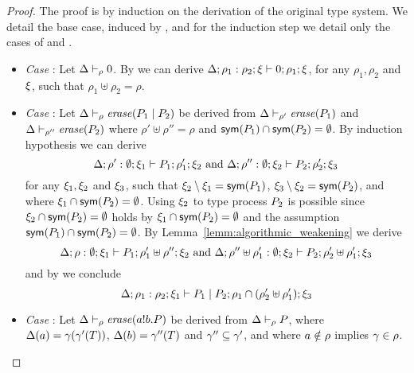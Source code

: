 \begin{proof}
The proof is by induction on the derivation of the original type system. We detail the base case, induced by , and for the induction step  we detail only the cases of  and .
\begin{itemize}
\item
\emph{Case} :
Let $\Delta \vdash_\rho 0$. 
By  we can derive $\Delta; \rho_1: \rho_2; \xi \vdash 0 ; \rho_1; \xi$, for any $\rho_1,  \rho_2$ and $\xi$, such that $\rho_1\uplus\rho_2=\rho$.
%
%
\item
\emph{Case} : Let $\Delta \vdash_{\rho} \mathit{erase} (P_1 \;|\; P_2)$ be derived from $\Delta \vdash_{\rho'} \mathit{erase}(P_1)$ and $\Delta \vdash_{\rho''} \mathit{erase}(P_2)$ where $\rho'\uplus\rho''=\rho$ and $\mathsf{sym}(P_1)\cap\mathsf{sym}(P_2)=\emptyset$.
By induction hypothesis we can derive
\[
\Delta; \rho': \emptyset; \xi_1 \vdash P_1; \rho_1'; \xi_2  \text{ and }  \Delta; \rho'': \emptyset; \xi_2 \vdash P_2; \rho_2'; \xi_3
\]
for any $\xi_1, \xi_2$ and $\xi_3$, such that $\xi_2\setminus\xi_1=\mathsf{sym}(P_1)$, $\xi_3\setminus\xi_2=\mathsf{sym}(P_2)$, and where $\xi_1 \cap \mathsf{sym}( P_2)=\emptyset$. Using $\xi_2$ to type process $P_2$  is possible since  $\xi_2\cap\mathsf{sym}(P_2)=\emptyset$ holds by $\xi_1 \cap \mathsf{sym}( P_2)=\emptyset$ and the assumption $\mathsf{sym}(P_1)\cap\mathsf{sym}(P_2)=\emptyset$.
By Lemma~\ref{lemm:algorithmic_weakening} we derive 
\[
\Delta; \rho: \emptyset; \xi_1 \vdash P_1; \rho_1'\uplus \rho''; \xi_2 \text{ and } \Delta; \rho''\uplus \rho_1': \emptyset; \xi_2 \vdash P_2; \rho_2'\uplus \rho_1'; \xi_3
\]
and by  we conclude
\[
\Delta; \rho_1: \rho_2; \xi_1 \vdash P_1 \;|\; P_2; \rho_1 \cap (\rho_2'\uplus \rho_1'); \xi_3
\]
%
%
\item
\emph{Case} : Let $\Delta \vdash_\rho \mathit{erase}(a!b.P)$ be derived from $\Delta \vdash_\rho P$, where $\Delta(a)=\gamma(\gamma'(T))$, $\Delta(b)=\gamma''(T)$ and $\gamma''\subseteq\gamma'$, and where $a\notin\rho$ implies $\gamma\in\rho$.

\end{itemize}
\end{proof}
